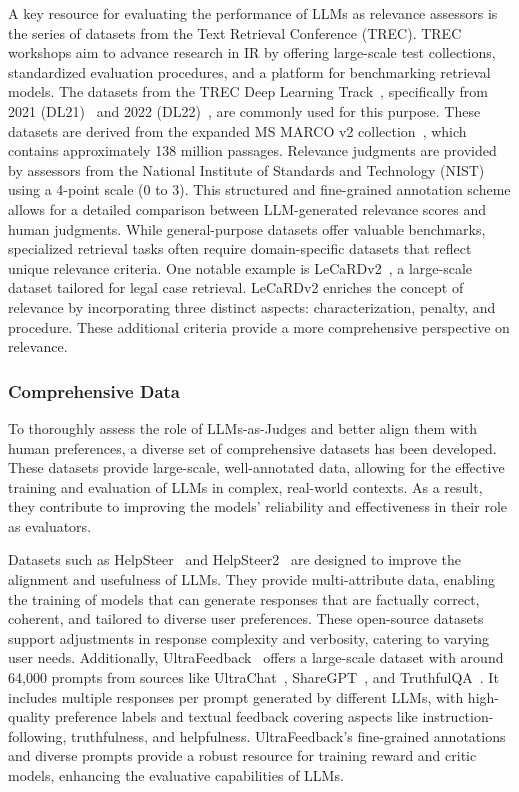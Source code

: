 A key resource for evaluating the performance of LLMs as relevance assessors is the series of datasets from the Text Retrieval Conference (TREC). TREC workshops aim to advance research in IR by offering large-scale test collections, standardized evaluation procedures, and a platform for benchmarking retrieval models. 
The datasets from the TREC Deep Learning Track~\cite{lawrie2024overview}, specifically from 2021 (DL21)~\cite{DBLP:conf/trec/Craswell0YCL21} and 2022 (DL22)~\cite{DBLP:conf/trec/Craswell0YCLVS22}, are commonly used for this purpose. These datasets are derived from the expanded MS MARCO v2 collection~\cite{bajaj2016ms}, which contains approximately 138 million passages. Relevance judgments are provided by assessors from the National Institute of Standards and Technology (NIST) using a 4-point scale (0 to 3). This structured and fine-grained annotation scheme allows for a detailed comparison between LLM-generated relevance scores and human judgments.
While general-purpose datasets offer valuable benchmarks, specialized retrieval tasks often require domain-specific datasets that reflect unique relevance criteria. One notable example is LeCaRDv2~\cite{li2024lecardv2}, a large-scale dataset tailored for legal case retrieval. LeCaRDv2 enriches the concept of relevance by incorporating three distinct aspects: characterization, penalty, and procedure. These additional criteria provide a more comprehensive perspective on relevance.




\subsubsection{Comprehensive Data}
\label{sec:Comprehensive Data}
To thoroughly assess the role of LLMs-as-Judges and better align them with human preferences, a diverse set of comprehensive datasets has been developed. These datasets provide large-scale, well-annotated data, allowing for the effective training and evaluation of LLMs in complex, real-world contexts. As a result, they contribute to improving the models’ reliability and effectiveness in their role as evaluators.

Datasets such as HelpSteer~\cite{wang2023helpsteer} and HelpSteer2~\cite{wang2024helpsteer2} are designed to improve the alignment and usefulness of LLMs. They provide multi-attribute data, enabling the training of models that can generate responses that are factually correct, coherent, and tailored to diverse user preferences. These open-source datasets support adjustments in response complexity and verbosity, catering to varying user needs. Additionally, UltraFeedback~\cite{cui2024ultrafeedback} offers a large-scale dataset with around 64,000 prompts from sources like UltraChat~\cite{ding2023enhancing}, ShareGPT~\cite{chiang2023vicuna}, and TruthfulQA~\cite{lin2021truthfulqa}. It includes multiple responses per prompt generated by different LLMs, with high-quality preference labels and textual feedback covering aspects like instruction-following, truthfulness, and helpfulness. UltraFeedback’s fine-grained annotations and diverse prompts provide a robust resource for training reward and critic models, enhancing the evaluative capabilities of LLMs.


